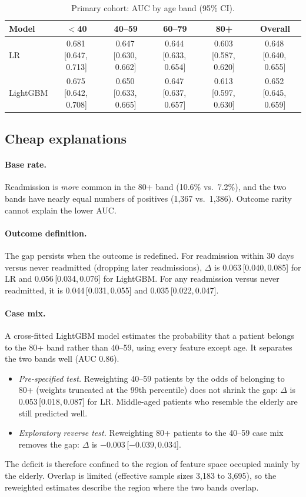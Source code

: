 \documentclass{article}
\newcommand{\ci}[2]{\,\mbox{[#1,\,#2]}}
\begin{document}
\begin{table}[h]
\centering\small
\caption{Primary cohort: AUC by age band (95\% CI).}
\label{tab:primary}
\setlength{\tabcolsep}{4pt}\footnotesize
\begin{tabular}{@{}lccccc@{}}
\toprule
Model & $<$40 & 40--59 & 60--79 & 80+ & Overall \\
\midrule
LR & 0.681\ci{0.647}{0.713} & 0.647\ci{0.630}{0.662} & 0.644\ci{0.633}{0.654} & 0.603\ci{0.587}{0.620} & 0.648\ci{0.640}{0.655} \\
LightGBM & 0.675\ci{0.642}{0.708} & 0.650\ci{0.633}{0.665} & 0.647\ci{0.637}{0.657} & 0.613\ci{0.597}{0.630} & 0.652\ci{0.645}{0.659} \\
\bottomrule
\end{tabular}
\end{table}

\subsection{Cheap explanations}

\paragraph{Base rate.} Readmission is \emph{more} common in the 80+ band (10.6\% vs.\ 7.2\%), and the two bands have nearly equal numbers of positives (1,367 vs.\ 1,386). Outcome rarity cannot explain the lower AUC.

\paragraph{Outcome definition.} The gap persists when the outcome is redefined. For readmission within 30 days versus never readmitted (dropping later readmissions), $\Delta$ is 0.063\ci{0.040}{0.085} for LR and 0.056\ci{0.034}{0.076} for LightGBM. For any readmission versus never readmitted, it is 0.044\ci{0.031}{0.055} and 0.035\ci{0.022}{0.047}.

\paragraph{Case mix.} A cross-fitted LightGBM model estimates the probability that a patient belongs to the 80+ band rather than 40--59, using every feature except age. It separates the two bands well (AUC 0.86).
\begin{itemize}
  \item \emph{Pre-specified test.} Reweighting 40--59 patients by the odds of belonging to 80+ (weights truncated at the 99th percentile) does not shrink the gap: $\Delta$ is 0.053\ci{0.018}{0.087} for LR. Middle-aged patients who resemble the elderly are still predicted well.
  \item \emph{Exploratory reverse test.} Reweighting 80+ patients to the 40--59 case mix removes the gap: $\Delta$ is $-0.003$\ci{$-$0.039}{0.034}.
\end{itemize}
The deficit is therefore confined to the region of feature space occupied mainly by the elderly. Overlap is limited (effective sample sizes 3,183 to 3,695), so the reweighted estimates describe the region where the two bands overlap.
\end{document}
